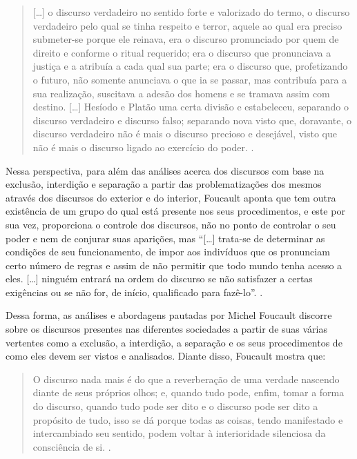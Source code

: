 \begin{refsection}
    \begin{quotation}
        [\dots] o discurso verdadeiro no sentido forte e valorizado do termo, o discurso verdadeiro pelo qual se tinha respeito e terror, aquele ao qual era preciso submeter-se porque ele reinava, era o discurso pronunciado por quem de direito e conforme o ritual requerido; era o discurso que pronunciava a justiça e a atribuía a cada qual sua parte; era o discurso que, profetizando o futuro, não somente anunciava o que ia se passar, mas contribuía para a sua realização, suscitava a adesão dos homens e se tramava assim com destino. [\dots] Hesíodo e Platão uma certa divisão e estabeleceu, separando o discurso verdadeiro e discurso falso; separando nova visto que, doravante, o discurso verdadeiro não é mais o discurso precioso e desejável, visto que não é mais o discurso ligado ao exercício do poder. \cite[p.~14--15]{Foucault1996Ordem}.
    \end{quotation}

    Nessa perspectiva, para além das análises acerca dos discursos com base na exclusão, interdição e separação a partir das problematizações dos mesmos através dos discursos do exterior e do interior, Foucault aponta que tem outra existência de um grupo do qual está presente nos seus procedimentos, e este por sua vez, proporciona o controle dos discursos, não no ponto de controlar o seu poder e nem de conjurar suas aparições, mas ``[\dots] trata-se de determinar as condições de seu funcionamento, de impor aos indivíduos que os pronunciam certo número de regras e assim de não permitir que todo mundo tenha acesso a eles. [\dots] ninguém entrará na ordem do discurso se não satisfazer a certas exigências ou se não for, de início, qualificado para fazê-lo''. \cite[p.~37]{Foucault1996Ordem}.

    Dessa forma, as análises e abordagens pautadas por Michel Foucault discorre sobre os discursos presentes nas diferentes sociedades a partir de suas várias vertentes como a exclusão, a interdição, a separação e os seus procedimentos de como eles devem ser vistos e analisados. Diante disso, Foucault mostra que:

    \begin{quotation}
        O discurso nada mais é do que a reverberação de uma verdade nascendo diante de seus próprios olhos; e, quando tudo pode, enfim, tomar a forma do discurso, quando tudo pode ser dito e o discurso pode ser dito a propósito de tudo, isso se dá porque todas as coisas, tendo manifestado e intercambiado seu sentido, podem voltar à interioridade silenciosa da consciência de si. \cite[p.~49]{Foucault1996Ordem}.
    \end{quotation}


\end{refsection}
